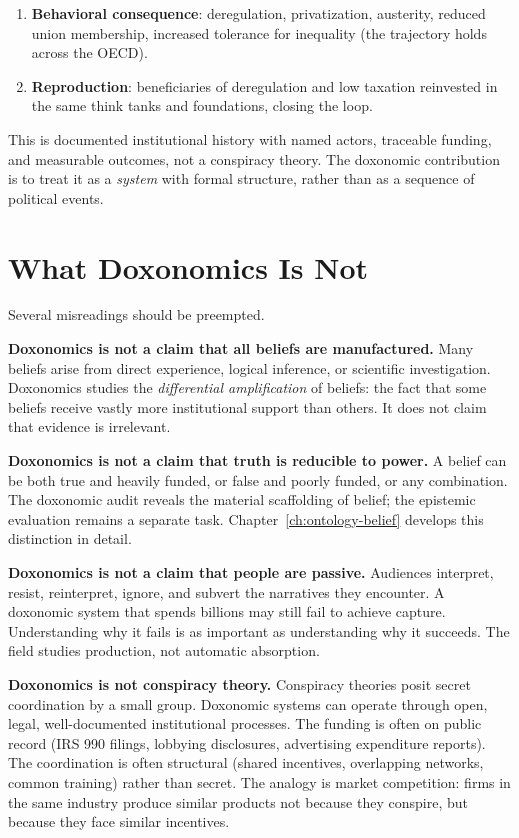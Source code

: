 \begin{example}
\begin{enumerate}[nosep]
  \item \textbf{Behavioral consequence}: deregulation, privatization, austerity, reduced union membership, increased tolerance for inequality (the trajectory holds across the OECD).
  \item \textbf{Reproduction}: beneficiaries of deregulation and low taxation reinvested in the same think tanks and foundations, closing the loop.
\end{enumerate}
This is documented institutional history with named actors, traceable funding, and measurable outcomes, not a conspiracy theory.
The doxonomic contribution is to treat it as a \emph{system} with formal structure, rather than as a sequence of political events.
\end{example}


\section{What Doxonomics Is Not}
\label{sec:ch1-is-not}

Several misreadings should be preempted.

\textbf{Doxonomics is not a claim that all beliefs are manufactured.}
Many beliefs arise from direct experience, logical inference, or scientific investigation.
Doxonomics studies the \emph{differential amplification} of beliefs: the fact that some beliefs receive vastly more institutional support than others.
It does not claim that evidence is irrelevant.

\textbf{Doxonomics is not a claim that truth is reducible to power.}
A belief can be both true and heavily funded, or false and poorly funded, or any combination.
The doxonomic audit reveals the material scaffolding of belief; the epistemic evaluation remains a separate task.
Chapter~\ref{ch:ontology-belief} develops this distinction in detail.

\textbf{Doxonomics is not a claim that people are passive.}
Audiences interpret, resist, reinterpret, ignore, and subvert the narratives they encounter.
A doxonomic system that spends billions may still fail to achieve capture.
Understanding why it fails is as important as understanding why it succeeds.
The field studies production, not automatic absorption.

\textbf{Doxonomics is not conspiracy theory.}
Conspiracy theories posit secret coordination by a small group.
Doxonomic systems can operate through open, legal, well-documented institutional processes.
The funding is often on public record (IRS 990 filings, lobbying disclosures, advertising expenditure reports).
The coordination is often structural (shared incentives, overlapping networks, common training) rather than secret.
The analogy is market competition: firms in the same industry produce similar products not because they conspire, but because they face similar incentives.


